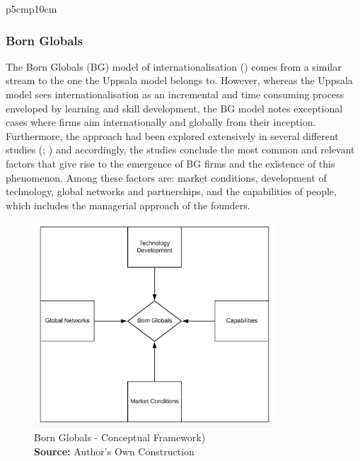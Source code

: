 \documentclass[11pt,a4paper]{article}
\newcommand*{\captionsource}[2]{%
  \caption[{#1}]{%
    #1%
    \\\hspace{\linewidth}%
    \textbf{Source:} #2%
  }%
}
\begin{document}
{\begin{table}[H]
\begin{tabular}{p{5cm}p{10cm}}
\bottomrule
\end{tabular}
\vspace{5mm}
\captionsetup{width=0.7\linewidth}
\caption{The Uppsala Model of Internationalisation: Consolidated Representation of Factors (Author's Compilation)} 
\label{table:uppsala_factors}
\end{table} 
	
\subsubsection{Born Globals}
\label{born_global_th}
The Born Globals (BG) model of internationalisation (\cite{rennieGlobalCompetitivenessBorn1993}) comes from a similar stream to the one the Uppsala model belongs to. However, whereas the Uppsala model sees internationalisation as an incremental and time consuming process enveloped by learning and skill development, the BG model notes exceptional cases where firms aim internationally and globally from their inception. Furthermore, the approach had been explored extensively in several different studies (\cite{madsenInternationalizationBornGlobals1997}; \cite{knightBornGlobalFirm1996}) and accordingly, the studies conclude the most common and relevant factors that give rise to the emergence of BG firms and the existence of this phenomenon. Among these factors are: market conditions, development of technology, global networks and partnerships, and the capabilities of people, which includes the managerial approach of the founders. \par

  \vspace{5mm}
\begin{figure}[H]
	\centering
  \includegraphics[width=90mm]{figures/fig_born_global_frm}
  \vspace{5mm}
    \captionsetup{justification=centering,margin=2cm}
      \captionsource{Born Globals - Conceptual Framework)}{Author's Own Construction}
	\label{fig:born_globals_frame}
\end{figure}


}
\end{document}
